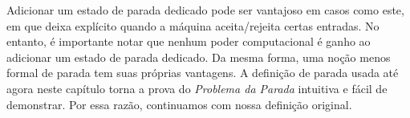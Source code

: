 \documentclass[../../../include/open-logic-section]{subfiles}
\begin{document}
\begin{explain}
Adicionar um estado de parada dedicado pode ser vantajoso em casos como
este, em que deixa explícito quando a máquina aceita/rejeita certas
entradas. No entanto, é importante notar que nenhum poder computacional é
ganho ao adicionar um estado de parada dedicado. Da mesma forma, uma noção
menos formal de parada tem suas próprias vantagens. A definição de
parada usada até agora neste capítulo torna a prova do
\emph{Problema da Parada} intuitiva e fácil de demonstrar. Por essa
razão, continuamos com nossa definição original.
\end{explain}
\end{document}
